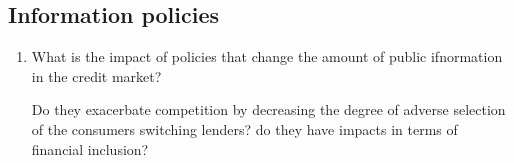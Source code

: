 \documentclass[12pt]{article}
\theoremstyle{plain}
\theoremstyle{plain}
\theoremstyle{definition}  %
\theoremstyle{remark}  %
\begin{document}
\subsection{Information policies}

\begin{enumerate}
    \item What is the impact of policies that change the amount of public ifnormation in the credit market? 
    

    Do they exacerbate competition by decreasing the degree of adverse selection of the consumers switching lenders? do they have impacts in terms of financial inclusion? 
\end{enumerate}
\end{document}
